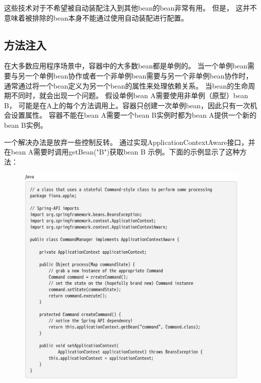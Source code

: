 这些技术对于不希望被自动装配注入到其他bean的bean非常有用。
但是，
这并不意味着被排除的bean本身不能通过使用自动装配进行配置。

\subsection{方法注入}

在大多数应用程序场景中，容器中的大多数bean都是单例的。
当一个单例bean需要与另一个单例bean协作或者一个非单例bean需要与另一个非单例bean协作时，
通常通过将一个bean定义为另一个bean的属性来处理依赖关系。
当bean的生命周期不同时，就会出现一个问题。
假设单例bean A需要使用非单例（原型）bean B，
可能是在A上的每个方法调用上。容器只创建一次单例bean，因此只有一次机会设置属性。
容器不能在bean A需要一个bean B实例时都为bean A提供一个新的bean B实例。


一个解决办法是放弃一些控制反转。
通过实现ApplicationContextAware接口，并
在bean A需要时调用getBean("B")获取bean B 示例。下面的示例显示了这种方法：

\newpage
\begin{figure}[ht]
    \centering
    \includegraphics[width=1\linewidth]{./Figure/59.png}
\end{figure}



